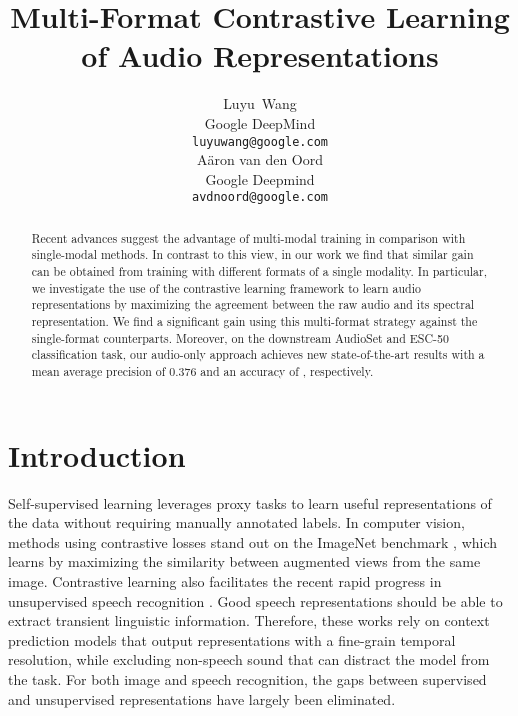 \documentclass{article}
\title{Multi-Format Contrastive Learning of Audio Representations}
\author{Luyu~Wang \\
  Google DeepMind\\
\texttt{luyuwang@google.com} \\
\And
  A\"aron van den Oord \\
  Google Deepmind \\
\texttt{avdnoord@google.com} \\
}
\begin{document}
\maketitle

\begin{abstract}
  Recent advances suggest the advantage of multi-modal training in comparison with single-modal methods. In contrast to this view, in our work we find that similar gain can be obtained from training with different formats of a single modality. In particular, we investigate the use of the contrastive learning framework to learn audio representations by maximizing the agreement between the raw audio and its spectral representation. We find a significant gain using this multi-format strategy against the single-format counterparts. Moreover, on the downstream AudioSet and ESC-50 classification task, our audio-only approach achieves new state-of-the-art results with a mean average precision of 0.376 and an accuracy of , respectively.
\end{abstract}

\section{Introduction}

Self-supervised learning leverages proxy tasks to learn useful representations of the data without requiring manually annotated labels. In computer vision, methods using contrastive losses \cite{hjelm2018learning, oord2018representation, bachman2019learning, henaff2020data, he2020momentum, chen2020simple, chen2020big} stand out on the ImageNet benchmark \cite{deng2009imagenet}, which learns by maximizing the similarity between augmented views from the same image. Contrastive learning also facilitates the recent rapid progress in unsupervised speech recognition \cite{schneider2019wav2vec, baevski2019vq, kawakami2020learning, riviere2020unsupervised, kahn2020libri, baevski2020wav2vec}. Good speech representations should be able to extract transient linguistic information. Therefore, these works rely on context prediction models that output representations with a fine-grain temporal resolution, while excluding non-speech sound that can distract the model from the task. For both image and speech recognition, the gaps between supervised and unsupervised representations have largely been eliminated.
\end{document}
